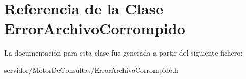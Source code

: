 \hypertarget{classErrorArchivoCorrompido}{\section{\-Referencia de la \-Clase \-Error\-Archivo\-Corrompido}
\label{classErrorArchivoCorrompido}
}


\-La documentación para esta clase fue generada a partir del siguiente fichero\-:\begin{DoxyCompactItemize}
\item 
servidor/\-Motor\-De\-Consultas/\-Error\-Archivo\-Corrompido.\-h\end{DoxyCompactItemize}
